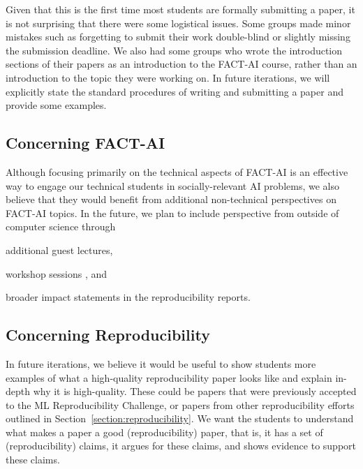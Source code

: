 Given that this is the first time most students are formally submitting a paper, it is not surprising that there were some logistical issues. 
Some groups made minor mistakes such as forgetting to submit their work double-blind or slightly missing the submission deadline. 
We also had some groups who wrote the introduction sections of their papers as an introduction to the FACT-AI course, rather than an introduction to the topic they were working on. 
In future iterations, we will explicitly state the standard procedures of writing and submitting a paper and provide some examples. 

\subsection{Concerning FACT-AI}
\label{section:non-technical}

Although focusing primarily on the technical aspects of FACT-AI is an effective way to engage our technical students in socially-relevant AI problems, we also believe that they would benefit from additional non-technical perspectives on FACT-AI topics. 
In the future, we plan to include perspective from outside of computer science through 
\begin{enumerate*}[label=(\roman*)]
\item additional guest lectures, 
\item workshop sessions \citep{skirpan2018ethics,shenvalue2021}, and 
\item broader impact statements \citep{campbell2021_responsible} in the reproducibility reports. 
\end{enumerate*}

\subsection{Concerning Reproducibility}
In future iterations, we believe it would be useful to show students more examples of what a high-quality reproducibility paper looks like and explain in-depth why it is high-quality. 
These could be papers that were previously accepted to the ML Reproducibility Challenge, or papers from other reproducibility efforts outlined in Section~\ref{section:reproducibility}. 
We want the students to understand what makes a paper a good (reproducibility) paper, that is, it has a set of (reproducibility) claims, it argues for these claims, and shows evidence to support these claims.  